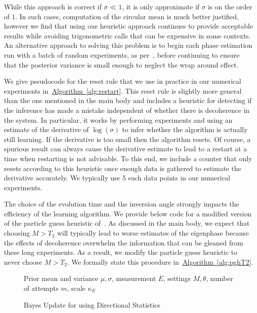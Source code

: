 \documentclass[aps,pra,amsmath,twocolumn,amssymb,superscriptaddress]{revtex4-1}
\newcommand{\CRej}{\text{RejF }}
\newcommand{\alg}[1]{\hyperref[alg:#1]{Algorithm~\ref*{alg:#1}}}
\begin{document}
{While this approach is correct if $\sigma\ll 1$, it is only approximate if $\sigma$ is on the order of $1$.  In such cases, computation of the circular mean is much better justified, however we find that using our heuristic approach continues to provide acceptable results while avoiding trigonometric calls that can be expensive in some contexts.  An alternative approach to solving this problem is to begin each phase estimation run with a batch of random experiments, as per~\cite{SHF14}, before continuing to ensure that the posterior variance is small enough to neglect the wrap around effect.

We give pseudocode for the reset rule that we use in practice in our numerical experiments in~\alg{restart}.  This reset rule is slightly more general than the one mentioned in the main body and includes a heuristic for detecting if the inference has made a mistake independent of whether there is decoherence in the system.  In particular, it works by performing experiments and using an estimate of the derivative of $\log(\sigma)$ to infer whether the algorithm is actually still learning.  If the derivative is too small then the algorithm resets.  Of course, a spurious result can always cause the derivative estimate to lead to a restart at a time when restarting is not advisable.  To this end, we include a counter that only resets according to this heuristic once enough data is gathered to estimate the derivative accurately.  We typically use $5$ such data points in our numerical experiments.

The choice of the evolution time and the inversion angle strongly impacts the efficiency of the learning algorithm.  We provide below code for a modified version of the
particle guess heuristic of~\cite{wiebe_hamiltonian_2014}.  As discussed in the main body, we expect that choosing $M> T_2$ will typically lead to worse estimates of the eigenphase because the effects of decoherence overwhelm the information that can be gleaned from these long experiments.  As a result, we modify the particle guess heuristic  to never choose $M> T_2$.  We formally state this procedure in~\alg{pghT2}.


\begin{figure}[h]
\begin{algorithm}[H]
    \caption{Bayes Update for \CRej using Directional Statistics}
    \label{alg:crej2}
    \begin{algorithmic}

        \Require Prior mean and variance $\mu,\sigma$, measurement $E$,
            settings $M,\theta$, number of attempts $m$, scale $\kappa_E$


\end{algorithmic}
\end{algorithm}
\end{figure}}
\end{document}
